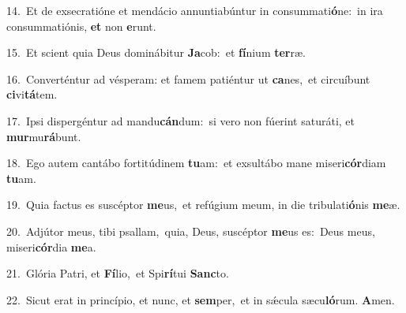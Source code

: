{\numbfont\textcolor{\numbcolor}{14.}}~Et de exsecratióne et mendácio annuntiabúntur in consummati\-\textbf{ó}\-ne:~\star in ira consummatiónis, \textbf{et} non \textbf{e}\-runt.\par
{\numbfont\textcolor{\numbcolor}{15.}}~Et scient quia Deus dominábitur \textbf{Ja}\-cob:~\star et \textbf{fí}\-nium \textbf{ter}\-ræ.\par
{\numbfont\textcolor{\numbcolor}{16.}}~Converténtur ad vésperam: et famem patiéntur ut \textbf{ca}\-nes,~\star et circuíbunt \textbf{ci}\-vi\-\textbf{tá}\-tem.\par
{\numbfont\textcolor{\numbcolor}{17.}}~Ipsi dispergéntur ad mandu\-\textbf{cán}\-dum:~\star si vero non fúerint saturáti, et \textbf{mur}\-mu\-\textbf{rá}\-bunt.\par
{\numbfont\textcolor{\numbcolor}{18.}}~Ego autem cantábo fortitúdinem \textbf{tu}\-am:~\star et exsultábo mane miseri\-\textbf{cór}\-diam \textbf{tu}\-am.\par
{\numbfont\textcolor{\numbcolor}{19.}}~Quia factus es suscéptor \textbf{me}\-us,~\star et refúgium meum, in die tribulati\-\textbf{ó}\-nis \textbf{me}\-æ.\par
{\numbfont\textcolor{\numbcolor}{20.}}~Adjútor meus, tibi psallam,~\dagger quia, Deus, suscéptor \textbf{me}\-us es:~\star Deus meus, miseri\-\textbf{cór}\-dia \textbf{me}\-a.\par
{\numbfont\textcolor{\numbcolor}{21.}}~Glória Patri, et \textbf{Fí}\-lio,~\star et Spi\-\textbf{rí}\-tui \textbf{Sanc}\-to.\par
{\numbfont\textcolor{\numbcolor}{22.}}~Sicut erat in princípio, et nunc, et \textbf{sem}\-per,~\star et in sǽcula sæcu\-\textbf{ló}\-rum. \textbf{A}\-men.\par
